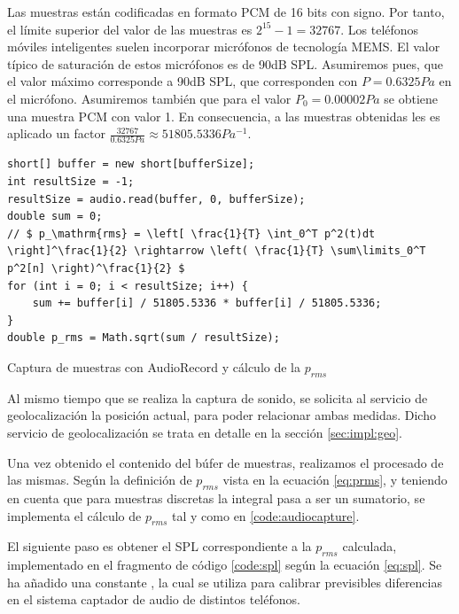     Las muestras están codificadas en formato \ac{PCM} de 16 bits con signo. Por tanto, el límite superior del valor de las muestras es $2^{15}-1=32767$. Los teléfonos móviles inteligentes suelen incorporar micrófonos de tecnología \ac{MEMS}. El valor típico de saturación de estos micrófonos es de 90dB SPL. Asumiremos pues, que el valor máximo  corresponde a 90dB SPL, que corresponden con $P=0.6325 Pa$ en el micrófono. Asumiremos también que para el valor $P_0=0.00002 Pa$ se obtiene una muestra PCM con valor 1. En consecuencia, a las muestras obtenidas les es aplicado un factor $\frac{32767}{0.6325 Pa} \approx  51805.5336 Pa^{-1}$.

\begin{listing}[H] 
\begin{verbatim}
short[] buffer = new short[bufferSize];
int resultSize = -1;
resultSize = audio.read(buffer, 0, bufferSize);
double sum = 0;
// $ p_\mathrm{rms} = \left[ \frac{1}{T} \int_0^T p^2(t)dt \right]^\frac{1}{2} \rightarrow \left( \frac{1}{T} \sum\limits_0^T p^2[n] \right)^\frac{1}{2} $
for (int i = 0; i < resultSize; i++) {
    sum += buffer[i] / 51805.5336 * buffer[i] / 51805.5336;
}
double p_rms = Math.sqrt(sum / resultSize);
\end{verbatim}
\caption{Captura de muestras con AudioRecord y cálculo de la $p_{rms}$}
\label{code:audiocapture}
\end{listing}

    Al mismo tiempo que se realiza la captura de sonido, se solicita al servicio de geolocalización la posición actual, para poder relacionar ambas medidas. Dicho servicio de geolocalización se trata en detalle en la sección \ref{sec:impl:geo}.

    Una vez obtenido el contenido del búfer de muestras, realizamos el procesado de las mismas. Según la definición de $p_{rms}$ vista en la ecuación \ref{eq:prms}, y teniendo en cuenta que para muestras discretas la integral pasa a ser un sumatorio, se implementa el cálculo de $p_{rms}$ tal y como en \ref{code:audiocapture}.

    El siguiente paso es obtener el \ac{SPL} correspondiente a la $p_{rms}$ calculada, implementado en el fragmento de código \autoref{code:spl} según la ecuación \ref{eq:spl}. Se ha añadido una constante , la cual se utiliza para calibrar previsibles diferencias en el sistema captador de audio de distintos teléfonos.

